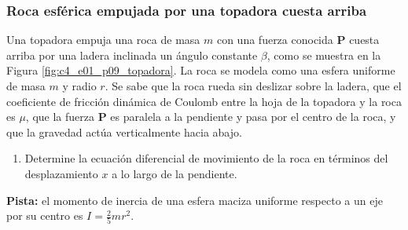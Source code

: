 \subsubsection{Roca esférica empujada por una topadora cuesta arriba}

Una topadora empuja una roca de masa $m$ con una fuerza conocida $\mathbf{P}$ cuesta arriba
por una ladera inclinada un ángulo constante $\beta$, como se muestra en la Figura
\ref{fig:c4_e01_p09_topadora}. La roca se modela como una esfera uniforme de masa $m$ y radio
$r$. Se sabe que la roca rueda sin deslizar sobre la ladera, que el coeficiente de fricción
dinámica de Coulomb entre la hoja de la topadora y la roca es $\mu$, que la fuerza
$\mathbf{P}$ es paralela a la pendiente y pasa por el centro de la roca, y que la gravedad
actúa verticalmente hacia abajo.

\begin{enumerate}
    \item Determine la ecuación diferencial de movimiento de la roca en términos del
          desplazamiento $x$ a lo largo de la pendiente.
\end{enumerate}

\textbf{Pista:} el momento de inercia de una esfera maciza uniforme respecto a un eje por su
centro es $I=\tfrac25 mr^2$.

